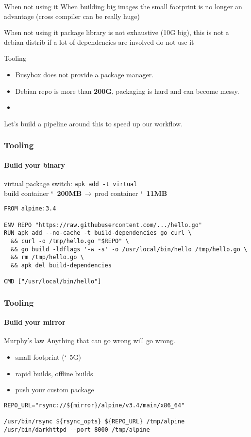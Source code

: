 \documentclass{beamer}
\begin{document}
\begin{frame}{When not using it}
  When building big images the small footprint is no longer an advantage
    (cross compiler can be really huge)
\end{frame}

\begin{frame}{When not using it}
  package library is not exhaustive (10G big), this is not a debian distrib
    if a lot of dependencies are involved do not use it
\end{frame}
\begin{frame}{Tooling}{}
  \begin{itemize}
    \item Busybox does not provide a package manager.
    \item Debian repo is more than \textbf{200G}, packaging is hard and can become messy.
    \item
  \end{itemize}
  Let's build a pipeline around this to speed up our workflow.
\end{frame}


\begin{frame}[fragile]
  \frametitle{Tooling}
  \framesubtitle{Build your binary}
  virtual package switch:  \texttt{apk add -t virtual} \\
  build container \textbf{\char`~200MB}$\,\to\,$prod container \textbf{\char`~11MB}

  \begin{verbatim}
FROM alpine:3.4

ENV REPO "https://raw.githubusercontent.com/.../hello.go"
RUN apk add --no-cache -t build-dependencies go curl \
  && curl -o /tmp/hello.go "$REPO" \
  && go build -ldflags '-w -s' -o /usr/local/bin/hello /tmp/hello.go \
  && rm /tmp/hello.go \
  && apk del build-dependencies

CMD ["/usr/local/bin/hello"]
  \end{verbatim}
\end{frame}

\begin{frame}[fragile]
  \frametitle{Tooling}
  \framesubtitle{Build your mirror}

  \begin{exampleblock}{Murphy's law}
    \vskip2mm
    Anything that can go wrong will go wrong.
    \vskip2mm
  \end{exampleblock}

    \begin{itemize}
    \item small footprint (\char`~5G)
    \item rapid builds, offline builds
    \item push your custom package
  \end{itemize}

  \begin{verbatim}
REPO_URL="rsync://${mirror}/alpine/v3.4/main/x86_64"

/usr/bin/rsync ${rsync_opts} ${REPO_URL} /tmp/alpine
/usr/bin/darkhttpd --port 8000 /tmp/alpine
  \end{verbatim}
\end{frame}
\end{document}
